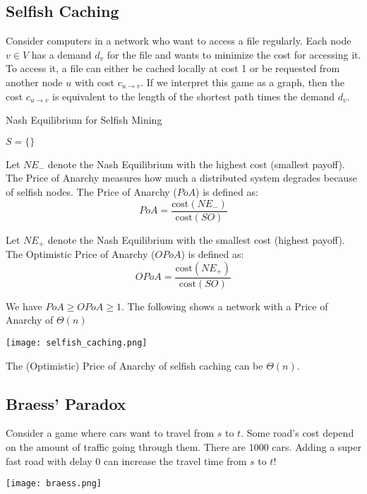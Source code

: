 \subsection{Selfish Caching}

Consider computers in a network who want to access a file regularly. Each node $v \in V$ has a demand $d_v$ for the file and wants to minimize the cost for accessing it. To access it, a file can either be cached locally at cost 1 or be requested from another node $u$ with cost $c_{u \to v}$. If we interpret this game as a graph, then the cost $c_{u \to v}$ is equivalent to the length of the shortest path times the demand $d_v$.\medskip

\begin{algorithm}[H]
\caption{Nash Equilibrium for Selfish Mining}
	$S = \{\}$ \\
\end{algorithm}
\medskip

Let $NE_-$ denote the Nash Equilibrium with the highest cost (smallest payoff). The Price of Anarchy measures how much a distributed system degrades because of selfish nodes. The Price of Anarchy ($PoA$) is defined as:
$$PoA = \frac{\text{cost}(NE_-)}{\text{cost}(SO)}$$

Let $NE_+$ denote the Nash Equilibrium with the smallest cost (highest payoff). The Optimistic Price of Anarchy ($OPoA$) is defined as:
$$OPoA = \frac{\text{cost}(NE_+)}{\text{cost}(SO)}$$

We have $PoA \geq OPoA \geq 1$. The following shows a network with a Price of Anarchy of $\Theta (n)$

\begin{center}
	\texttt{[image: selfish\_caching.png]}
\end{center}

The (Optimistic) Price of Anarchy of selfish caching can be $\Theta (n)$.


\subsection{Braess' Paradox}

Consider a game where cars want to travel from $s$ to $t$. Some road's cost depend on the amount of traffic going through them. There are 1000 cars. Adding a super fast road with delay 0 can increase the travel time from $s$ to $t$!
\begin{center}
	\texttt{[image: braess.png]}
\end{center}

